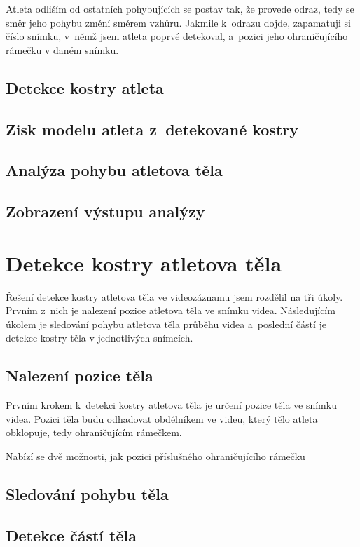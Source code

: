 Atleta odliším od ostatních pohybujících se postav tak, že provede odraz, tedy se směr jeho pohybu změní směrem vzhůru. Jakmile k~odrazu dojde, zapamatuji si číslo snímku, v~němž jsem atleta poprvé detekoval, a~pozici jeho ohraničujícího rámečku v daném snímku.

\subsection{Detekce kostry atleta}



\subsection{Zisk modelu atleta z~detekované kostry}

\subsection{Analýza pohybu atletova těla}

\subsection{Zobrazení výstupu analýzy}





\section{Detekce kostry atletova těla}

Řešení detekce kostry atletova těla ve videozáznamu jsem rozdělil na tři úkoly. Prvním z~nich je nalezení pozice atletova těla ve snímku videa. Následujícím úkolem je sledování pohybu atletova těla průběhu videa a~poslední částí je detekce kostry těla v jednotlivých snímcích.

\subsection{Nalezení pozice těla}

Prvním krokem k~detekci kostry atletova těla je určení pozice těla ve snímku videa. Pozici těla budu odhadovat obdélníkem ve videu, který tělo atleta obklopuje, tedy ohraničujícím rámečkem.

Nabízí se dvě možnosti, jak pozici příslušného ohraničujícího rámečku

\subsection{Sledování pohybu těla}

\subsection{Detekce částí těla}
